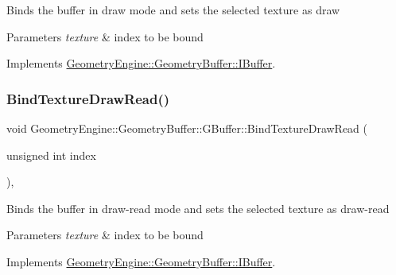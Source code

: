 Binds the buffer in draw mode and sets the selected texture as draw 
\begin{DoxyParams}{Parameters}
{\em texture} & index to be bound \\
\hline
\end{DoxyParams}


Implements \mbox{\hyperlink{class_geometry_engine_1_1_geometry_buffer_1_1_i_buffer_ac5b3fcf3ea4dfc4e5530cb0f4a9005a6}{Geometry\+Engine\+::\+Geometry\+Buffer\+::\+I\+Buffer}}.

\mbox{\label{class_geometry_engine_1_1_geometry_buffer_1_1_g_buffer_a1df706f920cc9a2b15609c6c7e179130}} 
\subsubsection{\texorpdfstring{BindTextureDrawRead()}{BindTextureDrawRead()}}
{\footnotesize\ttfamily void Geometry\+Engine\+::\+Geometry\+Buffer\+::\+G\+Buffer\+::\+Bind\+Texture\+Draw\+Read (\begin{DoxyParamCaption}\item[{unsigned int}]{index }\end{DoxyParamCaption})\hspace{0.3cm}{\ttfamily [override]}, {\ttfamily [virtual]}}

Binds the buffer in draw-\/read mode and sets the selected texture as draw-\/read 
\begin{DoxyParams}{Parameters}
{\em texture} & index to be bound \\
\hline
\end{DoxyParams}


Implements \mbox{\hyperlink{class_geometry_engine_1_1_geometry_buffer_1_1_i_buffer_a21843472d95d9c495a5df733ef2a64e3}{Geometry\+Engine\+::\+Geometry\+Buffer\+::\+I\+Buffer}}.

\mbox{\label{class_geometry_engine_1_1_geometry_buffer_1_1_g_buffer_a0aec7c721a63bfbb7b50882e4a34a861}} 
